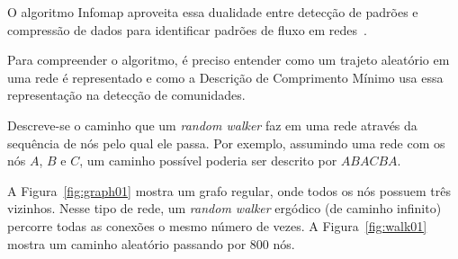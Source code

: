 \documentclass[
  article,
  11pt,
  a4paper,
  english,
  brazil,
  sumario=tradicional]{abntex2}
\begin{document}
O algoritmo Infomap aproveita essa dualidade entre detecção de padrões e compressão de dados para identificar padrões de fluxo em redes~\cite{Rosvall2009-sd}.

Para compreender o algoritmo, é preciso entender como um trajeto aleatório em uma rede é representado e como a Descrição de Comprimento Mínimo usa essa representação na detecção de comunidades.

Descreve-se o caminho que um \textit{random walker} faz em uma rede através da sequência de nós pelo qual ele passa. Por exemplo, assumindo uma rede com os nós $A$, $B$ e $C$, um caminho possível poderia ser descrito por $ABACBA$.

A Figura~\ref{fig:graph01} mostra um grafo regular, onde todos os nós possuem três vizinhos. Nesse tipo de rede, um \textit{random walker} ergódico (de caminho infinito) percorre todas as conexões o mesmo número de vezes. A Figura~\ref{fig:walk01} mostra um caminho aleatório passando por 800 nós.
\end{document}
